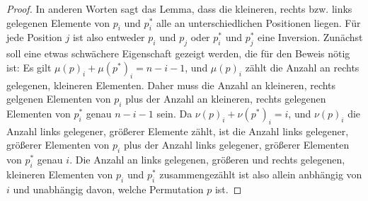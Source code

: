 \documentclass[a4paper, 10pt, ngerman]{article}
\begin{document}
\begin{proof}
    In anderen Worten sagt das Lemma, dass die kleineren, rechts bzw. links gelegenen Elemente von $p_i$ und $p^*_i$ alle an unterschiedlichen Positionen liegen. Für jede Position $j$ ist also entweder $p_i$ und $p_j$ oder $p^*_i$ und $p^*_j$ eine Inversion. Zunächst soll eine etwas schwächere Eigenschaft gezeigt werden, die für den Beweis nötig ist: Es gilt $\mu(p)_i + \mu(p^*)_i = n - i - 1$, und $\mu(p)_i$ zählt die Anzahl an rechts gelegenen, kleineren Elementen. Daher muss die Anzahl an kleineren, rechts gelgenen Elementen von $p_i$ plus der Anzahl an kleineren, rechts gelegenen Elementen von $p^*_i$ genau $n-i-1$ sein. Da $\nu(p)_i + \nu(p^*)_i = i$, und $\nu(p)_i$ die Anzahl links gelegener, größerer Elemente zählt, ist die Anzahl links gelegener, größerer Elementen von $p_i$ plus der Anzahl links gelegener, größerer Elementen von $p^*_i$ genau $i$. Die Anzahl an links gelegenen, größeren und rechts gelegenen, kleineren Elementen von $p_i$ und $p^*_i$ zusammengezählt ist also allein anbhängig von $i$ und unabhängig davon, welche Permutation $p$ ist.


\end{proof}
\end{document}
